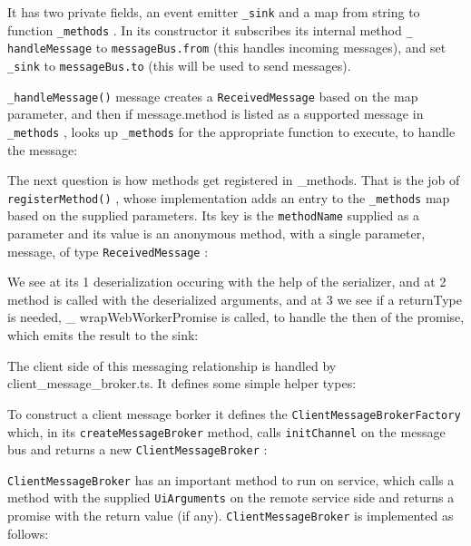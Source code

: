 

It has two private fields, an event emitter
\texttt{\_sink}
and a map from string to function
\texttt{\_methods}
. In its constructor it subscribes its internal method
\texttt{\_ handleMessage}
to
\texttt{messageBus.from}
(this handles incoming messages), and set
\texttt{\_sink}
to
\texttt{messageBus.to}
(this will be used to send messages).

\texttt{\_handleMessage()}
message creates a
\texttt{ReceivedMessage}
based on the map
parameter, and then if message.method is listed as a supported message in
\texttt{\_methods}
, looks up
\texttt{\_methods}
for the appropriate function to execute, to handle the
message:



The next question is how methods get registered in \_methods. That is the job of
\texttt{registerMethod()}
, whose implementation adds an entry to the
\texttt{\_methods}
map based
on the supplied parameters. Its key is the
\texttt{methodName}
supplied as a parameter and its
value is an anonymous method, with a single parameter, message, of type
\texttt{ReceivedMessage}
:



We see at its
1
deserialization occuring with the help of the serializer, and at
2
method is called with the deserialized arguments, and at
3
we see if a returnType is
needed, \_ wrapWebWorkerPromise is called, to handle the then of the promise, which
emits the result to the sink:



The client side of this messaging relationship is handled by client\_message\_broker.ts.
It defines some simple helper types:



To construct a client message borker it defines the
\texttt{ClientMessageBrokerFactory}
which, in its
\texttt{createMessageBroker}
method, calls
\texttt{initChannel}
on the message bus
and returns a new
\texttt{ClientMessageBroker}
:



\texttt{ClientMessageBroker}
has an important method to run on service, which calls a
method with the supplied
\texttt{UiArguments}
on the remote service side and returns a
promise with the return value (if any).
\texttt{ClientMessageBroker}
is implemented as
follows:

